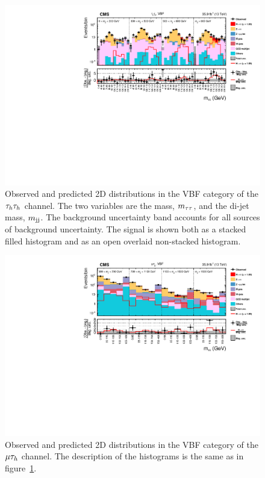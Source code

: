 \begin{figure}[htbp]
\centering
     \includegraphics[width=1.0\textwidth]{higgs_to_taus/plots/Figure_006.pdf}
     \caption{
Observed and predicted 2D distributions in the VBF category of the $\tau_{h}\tau_{h}$ channel.
The two variables are the mass, $m_{\tau\tau}$, and the di-jet mass, $m_\mathrm{jj}$.
The background uncertainty band accounts for all sources 
of background uncertainty. 
The signal is shown both as a stacked filled histogram and as an open overlaid non-stacked histogram.
}
     \label{fig:mass_tt_vbf}
\end{figure}

\begin{figure}[htbp]
\centering
     \includegraphics[width=1.0\textwidth]{higgs_to_taus/plots/Figure_007.pdf}
     \caption{Observed and predicted 2D distributions in the VBF category of the $\mu\tau_{h}$ channel. The description of the histograms is the same as in figure~\ref{fig:mass_tt_vbf}.}
     \label{fig:mass_mt_vbf}
\end{figure}

